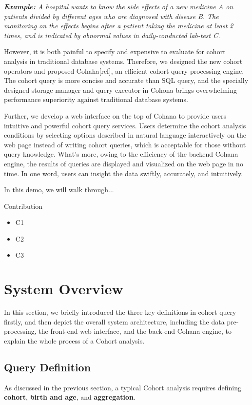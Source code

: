 \documentclass[10pt,conference,letterpaper]{IEEEtran}
\begin{document}
\emph{\textbf{Example:} A hospital wants to know the side effects of a new medicine A on patients divided by different ages who are diagnosed with disease B. The monitoring on the effects begins after a patient taking the medicine at least 2 times, and is indicated by abnormal values in daily-conducted lab-test C.}

However, it is both painful to specify and expensive to evaluate for cohort analysis in traditional database systems. Therefore, we designed the new cohort operators and proposed Cohaha[ref], an efficient cohort query processing engine. The cohort query is more concise and accurate than SQL query, and the specially designed storage manager and query executor in Cohona brings overwhelming performance superiority against traditional database systems. 

Further, we develop a web interface on the top of Cohana to provide users intuitive and powerful cohort query services. Users determine the cohort analysis conditions by selecting options described in natural language interactively on the web page instead of writing cohort queries, which is acceptable for those without query knowledge. What's more, owing to the efficiency of the backend Cohana engine, the results of queries are displayed and visualized on the web page in no time. In one word, users can insight the data swiftly, accurately, and intuitively. 

In this demo, we will walk through...

Contribution
\begin{itemize}
\item	C1
\item   C2
\item   C3
\end{itemize}

\section{System Overview}
In this section, we briefly introduced the three key definitions in cohort query firstly, and then depict the overall system architecture, including the data pre-processing, the front-end web interface, and the back-end Cohana engine, to explain the whole process of a Cohort analysis.  

\subsection{Query Definition}
As discussed in the previous section, a typical Cohort analysis requires defining \textbf{cohort}, \textbf{birth and age}, and \textbf{aggregation}. 
\end{document}
